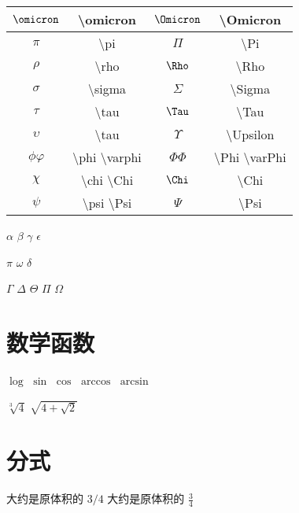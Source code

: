 \documentclass{ctexart}
\begin{document}
\begin{table}[h]
\begin{tabular}{|c|c|c|c|}
                \hline
                $\omicron$ & \textbackslash omicron & $\Omicron$ & \textbackslash Omicron\\
                \hline
                $\pi$ & \textbackslash pi & $\Pi$ & \textbackslash Pi\\
                \hline
                $\rho$ & \textbackslash rho & $\Rho$ & \textbackslash Rho\\
                \hline
                $\sigma$ & \textbackslash sigma & $\Sigma$ & \textbackslash Sigma\\
                \hline
                $\tau$ & \textbackslash tau & $\Tau$ & \textbackslash Tau\\
                \hline
                $\upsilon$ & \textbackslash tau & $\Upsilon$ & \textbackslash Upsilon\\
                \hline
                $\phi \varphi$ & \textbackslash phi \textbackslash varphi & $\Phi \varPhi$ & \textbackslash Phi \textbackslash varPhi\\
                \hline
                $\chi $ & \textbackslash chi \textbackslash Chi & $\Chi$ & \textbackslash Chi \\
                \hline
                $\psi $ & \textbackslash psi \textbackslash Psi & $\Psi$ & \textbackslash Psi \\
                
                \hline
            \end{tabular}
        \end{table}

        $\alpha$ $\beta$ $\gamma$ $\epsilon$
    

        $\pi$ $\omega$ $\delta$
        
        $\Gamma$ $\Delta$ $\Theta$ $\Pi$ $\Omega$
        
        \section{数学函数}
        $\log$
        $\sin$
        $\cos$
        $\arccos$
        $\arcsin$

        $\sqrt[3]{4}$
        $\sqrt{4+\sqrt{2}}$
        
        \section{分式}
        
        大约是原体积的 $3/4$
        大约是原体积的 $\frac{3}{4}$
        
\end{document}
